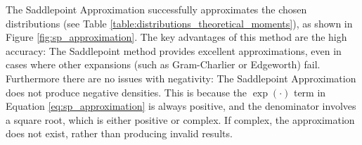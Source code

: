 The Saddlepoint Approximation successfully approximates the chosen distributions (see Table \ref{table:distributions_theoretical_moments}), as shown in Figure \ref{fig:sp_approximation}. The key advantages of this method are the high accuracy: The Saddlepoint method provides excellent approximations, even in cases where other expansions (such as Gram-Charlier or Edgeworth) fail. Furthermore there are no issues with negativity: The Saddlepoint Approximation does not produce negative densities. This is because the $\exp(\cdot)$ term in Equation \eqref{eq:sp_approximation} is always positive, and the denominator involves a square root, which is either positive or complex. If complex, the approximation does not exist, rather than producing invalid results.
